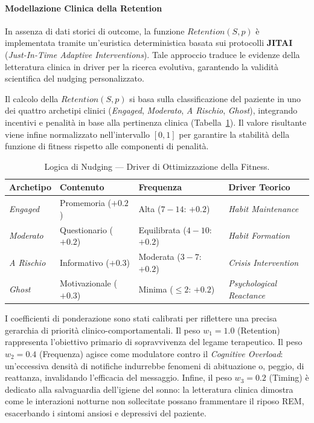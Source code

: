 \paragraph{Modellazione Clinica della Retention} 
In assenza di dati storici di outcome, la funzione $Retention(S, p)$ è implementata tramite un'euristica deterministica basata sui protocolli \textbf{JITAI} (\textit{Just-In-Time Adaptive Interventions}). Tale approccio traduce le evidenze della letteratura clinica in driver per la ricerca evolutiva, garantendo la validità scientifica del nudging personalizzato.

Il calcolo della $Retention(S, p)$ si basa sulla classificazione del paziente in uno dei quattro archetipi clinici (\textit{Engaged}, \textit{Moderato}, \textit{A Rischio}, \textit{Ghost}), integrando incentivi e penalità in base alla pertinenza clinica (Tabella~\ref{tab:ga_expert_system}). Il valore risultante viene infine normalizzato nell'intervallo $[0, 1]$ per garantire la stabilità della funzione di fitness rispetto alle componenti di penalità.

\begin{table}[H]
\centering
\caption{Logica di Nudging --- Driver di Ottimizzazione della Fitness.}
\label{tab:ga_expert_system}
\begin{tabular}{@{}llll@{}}
\toprule
\textbf{Archetipo} & \textbf{Contenuto} & \textbf{Frequenza} & \textbf{Driver Teorico} \\ \midrule
\textit{Engaged} & Promemoria ($+0.2$) & Alta ($7-14$: $+0.2$) & \textit{Habit Maintenance} \\
\textit{Moderato} & Questionario ($+0.2$) & Equilibrata ($4-10$: $+0.2$) & \textit{Habit Formation} \\
\textit{A Rischio} & Informativo ($+0.3$) & Moderata ($3-7$: $+0.2$) & \textit{Crisis Intervention} \\
\textit{Ghost} & Motivazionale ($+0.3$) & Minima ($\leq 2$: $+0.2$) & \textit{Psychological Reactance} \\ \bottomrule
\end{tabular}
\end{table}
I coefficienti di ponderazione sono stati calibrati per riflettere una precisa gerarchia di priorità clinico-comportamentali. Il peso $w_1 = 1.0$ (Retention) rappresenta l'obiettivo primario di sopravvivenza del legame terapeutico. Il peso $w_2 = 0.4$ (Frequenza) agisce come modulatore contro il \textit{Cognitive Overload}: un'eccessiva densità di notifiche indurrebbe fenomeni di abituazione o, peggio, di reattanza, invalidando l'efficacia del messaggio. Infine, il peso $w_3 = 0.2$ (Timing) è dedicato alla salvaguardia dell'igiene del sonno: la letteratura clinica dimostra come le interazioni notturne non sollecitate possano frammentare il riposo REM, esacerbando i sintomi ansiosi e depressivi del paziente.


